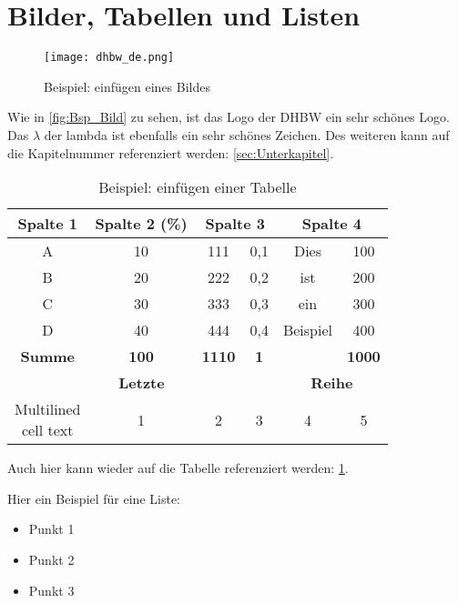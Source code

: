 
\newpage
\section{Bilder, Tabellen und Listen}


\begin{figure}[h]
    \centering
    \texttt{[image: dhbw\_de.png]}
    \caption{Beispiel: einfügen eines Bildes \cite{Mustermann2023}}
    \label{fig:Bsp_Bild}
\end{figure}

Wie in \autoref{fig:Bsp_Bild} zu sehen, ist das Logo der \ac{DHBW} ein sehr schönes Logo. Das $\lambda$ der \ac{lambda} ist ebenfalls ein sehr schönes Zeichen. Des weiteren kann auf die Kapitelnummer referenziert werden: \autoref{sec:Unterkapitel}.


\vspace{0.5cm}
\begin{table}[h]
    \centering
    \begin{tabular}[c]{|c|c|c|c|c|c|}
        \hline
            \rowcolor{lightgray} 
            \textbf{Spalte 1} & 
            \textbf{Spalte 2 (\%)} &  
            \multicolumn{2}{|c|}{\textbf{Spalte 3}} & 
            \multicolumn{2}{|c|}{\textbf{Spalte 4}}\\
        \hline
            A &     10 &    111 &   0,1 &   Dies &      100 \\
        \hline
            B &     20 &    222 &   0,2 &   ist &       200 \\
        \hline
            C &     30 &    333 &   0,3 &   ein &       300 \\
        \hline
            D &     40 &    444 &   0,4 &   Beispiel &  400 \\
        \hline
            \textbf{Summe} &
            \textbf{100} &
            \textbf{1110} &
            \textbf{1} &  &
            \textbf{1000}\\
        \hline
            \multicolumn{4}{|c|}{\textbf{Letzte}} & 
            \multicolumn{2}{|c|}{\textbf{Reihe}} \\
        \hline
            \makecell{Multilined \\ cell text} & 1 & 2 & 3 & 4 & 5 \\
        \hline
    \end{tabular}
    \caption{Beispiel: einfügen einer Tabelle}
    \label{tab:Bsp_Tabelle}
\end{table}

Auch hier kann wieder auf die Tabelle referenziert werden: \ref{tab:Bsp_Tabelle}.


\vspace{0.5cm}
Hier ein Beispiel für eine Liste:
\begin{itemize}[label=\textbullet]
    \item Punkt 1
    \item Punkt 2
    \item Punkt 3
\end{itemize}